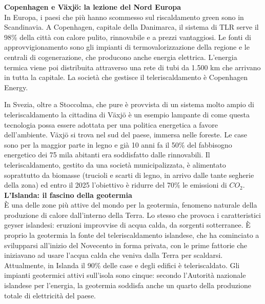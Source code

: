 \documentclass[laurea,oneside,11pt]{USiena_tesiLM3}
\begin{document}
\noindent\textbf{Copenhagen e Växjö: la lezione del Nord Europa}\\
\noindent In Europa, i paesi che più hanno scommesso sul riscaldamento green sono in Scandinavia. A Copenhagen, capitale della Danimarca, il sistema di TLR serve il 98\% della città con calore pulito, rinnovabile e a prezzi vantaggiosi. Le fonti di approvvigionamento sono gli impianti di termovalorizzazione della regione e le centrali di cogenerazione, che producono anche energia elettrica. L'energia termica viene poi distribuita attraverso una rete di tubi da 1.500 km che arrivano in tutta la capitale. La società che gestisce il teleriscaldamento è Copenhagen Energy.

In Svezia, oltre a Stoccolma, che pure è provvista di un sistema molto ampio di teleriscaldamento la cittadina di Växjö è un esempio lampante di come questa tecnologia possa essere adottata  per una politica energetica a favore dell'ambiente. Växjö si trova nel sud del paese, immersa nelle foreste. Le case sono per la maggior parte in legno e già 10 anni fa il 50\% del fabbisogno energetico dei 75 mila abitanti era soddisfatto dalle rinnovabili. Il teleriscaldamento, gestito da una società municipalizzata, è alimentato soprattutto da biomasse (trucioli e scarti di legno, in arrivo dalle tante segherie della zona) ed entro il 2025 l'obiettivo è ridurre del 70\% le emissioni di $CO_2$.\\

\noindent\textbf{L’Islanda: il fascino della geotermia}\\
\noindent \`E una delle zone più attive del mondo per la geotermia, fenomeno naturale della produzione di calore dall'interno della Terra. Lo stesso che provoca i caratteristici geyser islandesi: eruzioni improvvise di acqua calda, da sorgenti sotterranee. \`E proprio la geotermia la fonte del teleriscaldamento islandese, che ha cominciato a svilupparsi all'inizio del Novecento in forma privata, con le prime fattorie che iniziavano ad usare l'acqua calda che veniva dalla Terra per scaldarsi. Attualmente, in Islanda il 90\% delle case e degli edifici è teleriscaldato. Gli impianti geotermici attivi sull'isola sono cinque: secondo l'Autorità nazionale islandese per l'energia, la geotermia soddisfa anche un quarto della produzione totale di elettricità del paese.\\
\end{document}
